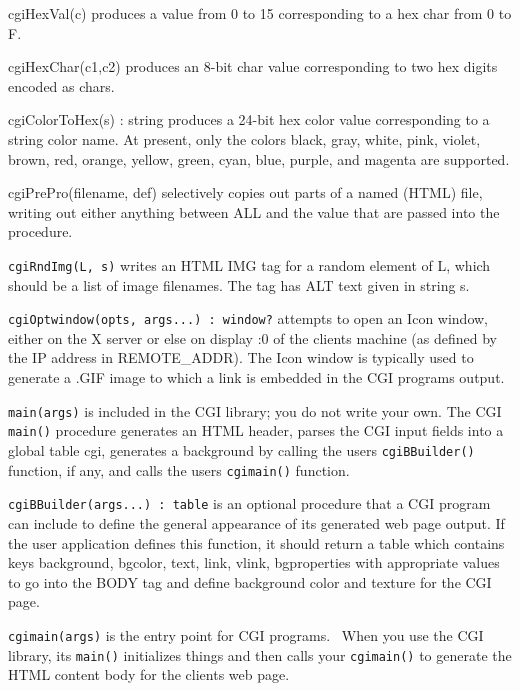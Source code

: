 \textsf{cgiHexVal(c)} produces a value from 0 to 15 corresponding to a
hex char from 0 to F. 

\textsf{cgiHexChar(c1,c2)} produces an 8-bit char value corresponding to
two hex digits encoded as chars. 

\textsf{cgiColorToHex(s) : string} produces a 24-bit hex color value
corresponding to a string color name. At present, only the colors
black, gray, white, pink, violet, brown, red, orange, yellow, green,
cyan, blue, purple, and magenta are supported. 

\textsf{cgiPrePro(filename, def)} selectively copies out parts of a
named (HTML) file, writing out either anything between ALL and the
value that are passed into the procedure. 

\texttt{cgiRndImg(L, s)} writes an HTML IMG tag for a random element of
L, which should be a list of image filenames. The tag has ALT text
given in string s. 

\texttt{cgiOptwindow(opts, args...) : window?} attempts to open an Icon
window, either on the X server or else on display :0 of the
client{\textquotesingle}s machine (as defined by the IP address in
REMOTE\_ADDR). The Icon window is typically used to generate a .GIF
image to which a link is embedded in the CGI
program{\textquotesingle}s output. 

\texttt{main(args)} is included in the CGI library; you do not write
your own. The CGI \texttt{main()} procedure generates an HTML header,
parses the CGI input fields into a global table cgi, generates a
background by calling the user{\textquotesingle}s
\texttt{cgiBBuilder()} function, if any, and calls the
user{\textquotesingle}s \texttt{cgimain()} function. 

\texttt{cgiBBuilder(args...) : table} is an optional procedure that a
CGI program can include to define the general appearance of its
generated web page output. If the user application defines this
function, it should return a table which contains keys
{\textquotedbl}background{\textquotedbl},
{\textquotedbl}bgcolor{\textquotedbl},
{\textquotedbl}text{\textquotedbl}, {\textquotedbl}link{\textquotedbl},
{\textquotedbl}vlink{\textquotedbl},
{\textquotedbl}bgproperties{\textquotedbl} with appropriate values to
go into the BODY tag and define background color and texture for the
CGI page. 

\texttt{cgimain(args)} is the entry point for CGI programs. \ When you
use the CGI library, its \texttt{main()} initializes things and then
calls your \texttt{cgimain()} to generate the HTML content body for the
client{\textquotesingle}s web page. 

